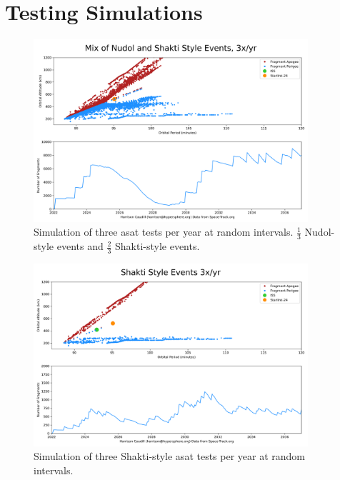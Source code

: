 \section{Testing Simulations}
\label{appendix::gabby}


\begin{figure}[h]
  \label{figure::gabby::doomsday::mix}
  \begin{center}
    \includegraphics[width=4in]{mix.png}
  \end{center}
  \caption{Simulation of three \ac{asat} tests per year at random
    intervals.  $\frac{1}{3}$ Nudol-style events and $\frac{2}{3}$
    Shakti-style events.}
\end{figure}

\begin{figure}[h]
  \label{figure::gabby::doomsday::shakti}
  \begin{center}
    \includegraphics[width=4in]{shakti.png}
  \end{center}
  \caption{Simulation of three Shakti-style \ac{asat} tests per year
    at random intervals.}
\end{figure}
